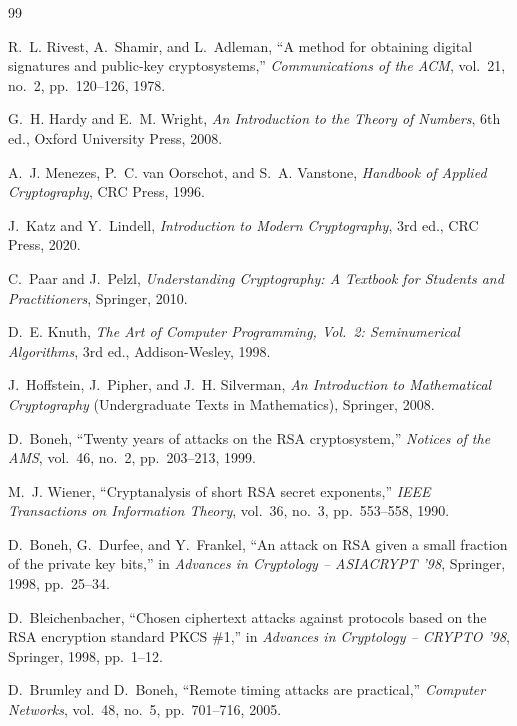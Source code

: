 \begin{thebibliography}{99}

R.~L. Rivest, A.~Shamir, and L.~Adleman,
``A method for obtaining digital signatures and public-key cryptosystems,''
\emph{Communications of the ACM}, vol.~21, no.~2, pp.~120--126, 1978.

G.~H. Hardy and E.~M. Wright,
\emph{An Introduction to the Theory of Numbers},
6th ed., Oxford University Press, 2008.

A.~J. Menezes, P.~C. van Oorschot, and S.~A. Vanstone,
\emph{Handbook of Applied Cryptography},
CRC Press, 1996.

J.~Katz and Y.~Lindell,
\emph{Introduction to Modern Cryptography},
3rd ed., CRC Press, 2020.

C.~Paar and J.~Pelzl,
\emph{Understanding Cryptography: A Textbook for Students and Practitioners},
Springer, 2010.

D.~E. Knuth,
\emph{The Art of Computer Programming, Vol.~2: Seminumerical Algorithms},
3rd ed., Addison-Wesley, 1998.

J.~Hoffstein, J.~Pipher, and J.~H. Silverman,
\emph{An Introduction to Mathematical Cryptography} (Undergraduate Texts in Mathematics),
Springer, 2008.

D.~Boneh,
``Twenty years of attacks on the RSA cryptosystem,''
\emph{Notices of the AMS}, vol.~46, no.~2, pp.~203--213, 1999.

M.~J. Wiener,
``Cryptanalysis of short RSA secret exponents,''
\emph{IEEE Transactions on Information Theory}, vol.~36, no.~3, pp.~553--558, 1990.

D.~Boneh, G.~Durfee, and Y.~Frankel,
``An attack on RSA given a small fraction of the private key bits,''
in \emph{Advances in Cryptology -- ASIACRYPT '98}, Springer, 1998, pp.~25--34.

D.~Bleichenbacher,
``Chosen ciphertext attacks against protocols based on the RSA encryption standard PKCS \#1,''
in \emph{Advances in Cryptology -- CRYPTO '98}, Springer, 1998, pp.~1--12.

D.~Brumley and D.~Boneh,
``Remote timing attacks are practical,''
\emph{Computer Networks}, vol.~48, no.~5, pp.~701--716, 2005.


\end{thebibliography}
